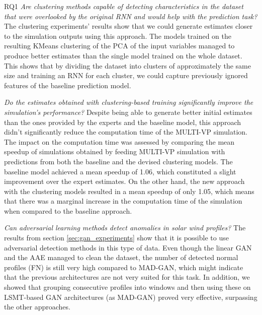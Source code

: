 \begin{description}
    \item{RQ1} \textit{Are clustering methods capable of detecting characteristics in the dataset that were overlooked by the original RNN and would help with the prediction task?} The clustering experiments' results show that we could generate estimates closer to the simulation outputs using this approach. The models trained on the resulting KMeans clustering of the PCA of the input variables managed to produce better estimates than the single model trained on the whole dataset. This shows that by dividing the dataset into clusters of approximately the same size and training an RNN for each cluster, we could capture previously ignored features of the baseline prediction model.

    \item[RQ2] \textit{Do the estimates obtained with clustering-based training significantly improve the simulation’s performance?} Despite being able to generate better initial estimates than the ones provided by the experts and the baseline model, this approach didn't significantly reduce the computation time of the MULTI-VP simulation. The impact on the computation time was assessed by comparing the mean speedup of simulations obtained by feeding MULTI-VP simulation with predictions from both the baseline and the devised clustering models. The baseline model achieved a mean speedup of 1.06, which constituted a slight improvement over the expert estimates. On the other hand, the new approach with the clustering models resulted in a mean speedup of only 1.05, which means that there was a marginal increase in the computation time of the simulation when compared to the baseline approach.

    \item[RQ3] \textit{Can adversarial learning methods detect anomalies in solar wind profiles?} The results from section \ref{sec:gan_experiments} show that it is possible to use adversarial detection methods in this type of data. Even though the linear GAN and the AAE managed to clean the dataset, the number of detected normal profiles (FN) is still very high compared to MAD-GAN, which might indicate that the previous architectures are not very suited for this task. In addition, we showed that grouping consecutive profiles into windows and then using these on LSMT-based GAN architectures (as MAD-GAN) proved very effective, surpassing the other approaches.


\end{description}
